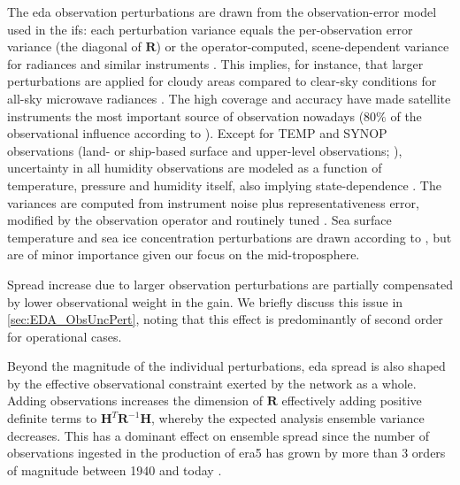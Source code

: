 The \gls{eda} observation perturbations are drawn from the observation-error model used in the \gls{ifs}: each perturbation variance equals the per-observation error variance (the diagonal of $\mathbf{R}$) or the operator-computed, scene-dependent variance for radiances and similar instruments \parencite{ecmwfIFSDocumentationCY41R22016, isaksenEnsembleDataAssimilations2010, hersbachERA5GlobalReanalysis2020}. This implies, for instance, that larger perturbations are applied for cloudy areas compared to clear-sky conditions for all-sky microwave radiances \parencite{geerObservationErrorsAllsky2011, geerAllskySatelliteData2018}. The high coverage and accuracy have made satellite instruments the most important source of observation nowadays ($80\%$ of the observational influence according to \textcite{cardinaliObservationInfluenceDiagnostic2013}). Except for TEMP and SYNOP observations (land- or ship-based surface and upper-level observations; \cite{ManualCodesInternational2011}), uncertainty in all humidity observations are modeled as a function of temperature, pressure and humidity itself, also implying state-dependence \parencite{ecmwfIFSDocumentationCY41R22016}. The variances are computed from instrument noise plus representativeness error, modified by the observation operator and routinely tuned \parencite{hollingsworthStatisticalStructureShort1984, desroziersDiagnosisObservationBackground2005}.  Sea surface temperature and sea ice concentration perturbations are drawn according to \textcite{hiraharaSeaSurfaceTemperature2016}, but are of minor importance given our focus on the mid-troposphere.

Spread increase due to larger observation perturbations are partially compensated by lower observational weight in the gain. We briefly discuss this issue in \cref{sec:EDA_ObsUncPert}, noting that this effect is predominantly of second order for operational cases.

Beyond the magnitude of the individual perturbations, \gls{eda} spread is also shaped by the effective observational constraint exerted by the network as a whole. Adding observations increases the dimension of $\mathbf{R}$ effectively adding positive definite terms to $\mathbf{H}^T\mathbf{R}^{-1}\mathbf{H}$, whereby the expected analysis ensemble variance decreases. This has a dominant effect on ensemble spread since the number of observations ingested in the production of \gls{era5} has grown by more than 3 orders of magnitude between 1940 and today \parencite{sociERA5GlobalReanalysis2024}.

